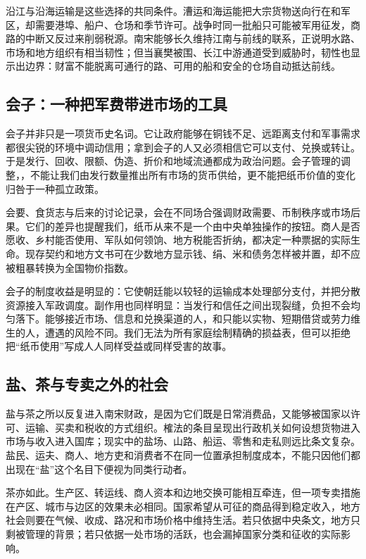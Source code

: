 沿江与沿海运输是这些选择的共同条件。漕运和海运能把大宗货物送向行在和军区，却需要港埠、船户、仓场和季节许可。战争时同一批船只可能被军用征发，商路的中断又反过来削弱税源。南宋能够长久维持江南与前线的联系，正说明水路、市场和地方组织有相当韧性；但当襄樊被围、长江中游通道受到威胁时，韧性也显示出边界：财富不能脱离可通行的路、可用的船和安全的仓场自动抵达前线。

\subsection{会子：一种把军费带进市场的工具}

会子并非只是一项货币史名词。它让政府能够在铜钱不足、远距离支付和军事需求都很尖锐的环境中调动信用；拿到会子的人又必须相信它可以支付、兑换或转让。于是发行、回收、限额、伪造、折价和地域流通都成为政治问题。会子管理的调整，，不能让我们由发行数量推出所有市场的货币供给，更不能把纸币价值的变化归咎于一种孤立政策。

会要、食货志与后来的讨论记录，会在不同场合强调财政需要、币制秩序或市场后果。它们的差异也提醒我们，纸币从来不是一个由中央单独操作的按钮。商人是否愿收、乡村能否使用、军队如何领饷、地方税能否折纳，都决定一种票据的实际生命。现存契约和地方文书可在少数地方显示钱、绢、米和债务怎样被并置，却不应被粗暴转换为全国物价指数。

会子的制度收益是明显的：它使朝廷能以较轻的运输成本处理部分支付，并把分散资源接入军政调度。副作用也同样明显：当发行和信任之间出现裂缝，负担不会均匀落下。能够接近市场、信息和兑换渠道的人，和只能以实物、短期借贷或劳力维生的人，遭遇的风险不同。我们无法为所有家庭绘制精确的损益表，但可以拒绝把“纸币使用”写成人人同样受益或同样受害的故事。

\subsection{盐、茶与专卖之外的社会}

盐与茶之所以反复进入南宋财政，是因为它们既是日常消费品，又能够被国家以许可、运输、买卖和税收的方式组织。榷法的条目呈现出行政机关如何设想货物进入市场与收入进入国库；现实中的盐场、山路、船运、零售和走私则远比条文复杂。盐民、运夫、商人、地方吏和消费者不在同一位置承担制度成本，不能只因他们都出现在“盐”这个名目下便视为同类行动者。

茶亦如此。生产区、转运线、商人资本和边地交换可能相互牵连，但一项专卖措施在产区、城市与边区的效果未必相同。国家希望从可征的商品得到稳定收入，地方社会则要在气候、收成、路况和市场价格中维持生活。若只依据中央条文，地方只剩被管理的背景；若只依据一处市场的活跃，也会漏掉国家分类和征收的实际影响。

